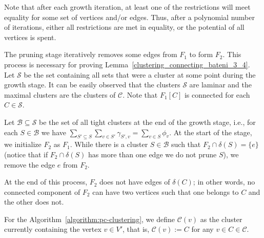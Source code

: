 Note that after each growth iteration, at least one of the restrictions will meet equality for some set of vertices and/or edges. Thus, after a polynomial number of iterations, either all restrictions are met in equality, or the potential of all vertices is spent.

The pruning stage iteratively removes some edges from \(F_1\) to form \(F_2\). This process is necessary for proving Lemma~\ref{clustering_connecting_bateni_3_4}. Let \(\mathcal{S}\) be the set containing all sets that were a cluster at some point during the growth stage. It can be easily observed that the clusters \(\mathcal{S}\) are laminar and the maximal clusters are the clusters of \(\mathcal{C}\). Note that \(F_1[C]\) is connected for each \(C \in \mathcal{S}\).

Let \(\mathcal{B} \subseteq \mathcal{S}\) be the set of all tight clusters at the end of the growth stage, i.e., for each \(S \in \mathcal{B}\) we have \(\sum_{S' \subseteq S} \sum_{v \in S'} \gamma_{S', v} = \sum_{v \in S} \phi_v\). At the start of the stage, we initialize \(F_2\) as \(F_1\). While there is a cluster \(S \in \mathcal{B}\) such that \(F_2 \cap \delta(S) = \{e\}\) (notice that if \(F_2 \cap \delta(S)\) has more than one edge we do not prune \(S\)), we remove the edge \(e\) from \(F_2\).

At the end of this process, \(F_2\) does not have edges of \(\delta(C)\); in other words, no connected component of \(F_2\) can have two vertices such that one belongs to \(C\) and the other does not.

For the Algorithm~\ref{algorithm:pc-clustering}, we define \(\mathcal{C}(v)\) as the cluster currently containing the vertex \(v \in V'\), that is, \(\mathcal{C}(v):= C\) for any \(v \in C \in \mathcal{C}\).

